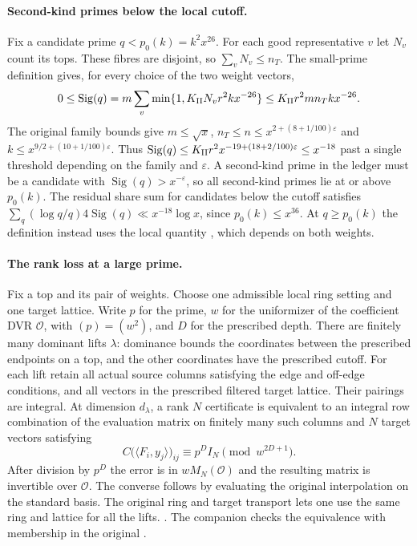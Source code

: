 \paragraph{Second-kind primes below the local cutoff.}
Fix a candidate prime \(q<p_0(k)=k^2x^{26}\). For each good representative \(v\)
let \(N_v\) count its tops. These fibres are disjoint, so
\(\sum_vN_v\le n_T\). The small-prime definition gives, for every
choice of the two weight vectors,
\[
 0\le \operatorname{Sig}(q)
   =m\sum_v\min\{1,K_{\rm II}N_v r^2 k x^{-26}\}
   \le K_{\rm II}r^2 m n_T k x^{-26}.
\]
The original family bounds give \(m\le\sqrt x\),
\(n_T\le n\le x^{2+(8+1/100)\varepsilon}\) and
\(k\le x^{9/2+(10+1/100)\varepsilon}\). Thus
\(\operatorname{Sig}(q)\le K_{\rm II}r^2
x^{-19+(18+2/100)\varepsilon}\le x^{-18}\) past a single threshold
depending on the family and \(\varepsilon\). A second-kind prime in
the ledger must be a candidate with \(\operatorname{Sig}(q)>x^{-\varepsilon}\),
so all second-kind primes lie at or above \(p_0(k)\).
The residual share sum for candidates below the cutoff satisfies
\(\sum_q(\log q/q)4\operatorname{Sig}(q)\ll x^{-18}\log x\), since
\(p_0(k)\le x^{36}\). At \(q\ge p_0(k)\) the definition instead
uses the local quantity , which depends on both weights.

\paragraph{The rank loss at a large prime.}
Fix a top and its pair of weights. Choose one admissible local ring
setting and one target lattice. Write \(p\) for the prime, \(w\)
for the uniformizer of the coefficient DVR \(\mathcal O\), with
\((p)=(w^2)\), and \(D\) for the prescribed depth. There are finitely
many dominant lifts \(\lambda\): dominance bounds the coordinates
between the prescribed endpoints on a top, and the other coordinates
have the prescribed cutoff. For each lift retain all actual source
columns satisfying the edge and off-edge conditions, and all vectors
in the prescribed filtered target lattice. Their pairings are integral.
At dimension \(d_\lambda\), a rank \(N\) certificate is equivalent to
an integral row combination of the evaluation matrix on finitely many
such columns and \(N\) target vectors satisfying
\[
        C\big(\langle F_i,y_j\rangle\big)_{ij}
                  \equiv p^D I_N\pmod{w^{2D+1}} .
\]
After division by \(p^D\) the error is in \(wM_N(\mathcal O)\)
and the resulting matrix is invertible over \(\mathcal O\).
The converse follows by evaluating the original interpolation on
the standard basis. The original ring and target transport lets one
use the same ring and lattice for all the lifts.
.
The companion  checks the equivalence
with membership in the original .


